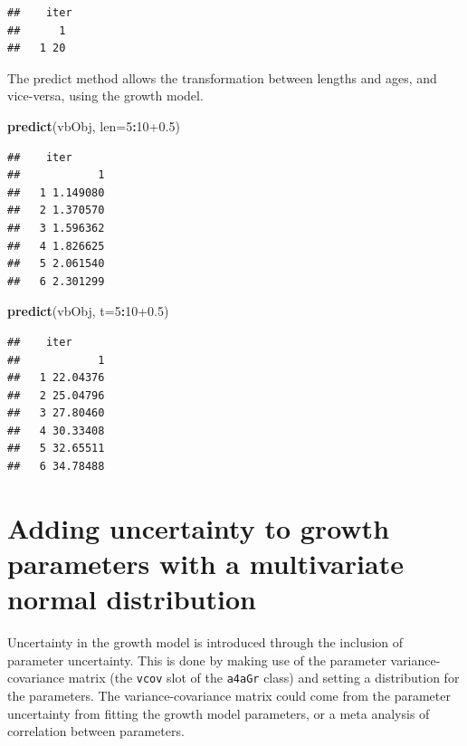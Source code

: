 \documentclass[
]{book}
\newenvironment{Shaded}{\begin{snugshade}}{\end{snugshade}}
\newcommand{\AttributeTok}[1]{\textcolor[rgb]{0.13,0.29,0.53}{#1}}
\newcommand{\DecValTok}[1]{\textcolor[rgb]{0.00,0.00,0.81}{#1}}
\newcommand{\FloatTok}[1]{\textcolor[rgb]{0.00,0.00,0.81}{#1}}
\newcommand{\FunctionTok}[1]{\textcolor[rgb]{0.13,0.29,0.53}{\textbf{#1}}}
\newcommand{\NormalTok}[1]{#1}
\newcommand{\SpecialCharTok}[1]{\textcolor[rgb]{0.81,0.36,0.00}{\textbf{#1}}}
\begin{document}
\begin{verbatim}
##    iter
##      1
##   1 20
\end{verbatim}

The predict method allows the transformation between lengths and ages, and vice-versa, using the growth model.

\begin{Shaded}
\begin{Highlighting}[]
\FunctionTok{predict}\NormalTok{(vbObj, }\AttributeTok{len=}\DecValTok{5}\SpecialCharTok{:}\DecValTok{10}\FloatTok{+0.5}\NormalTok{)}
\end{Highlighting}
\end{Shaded}

\begin{verbatim}
##    iter
##            1
##   1 1.149080
##   2 1.370570
##   3 1.596362
##   4 1.826625
##   5 2.061540
##   6 2.301299
\end{verbatim}

\begin{Shaded}
\begin{Highlighting}[]
\FunctionTok{predict}\NormalTok{(vbObj, }\AttributeTok{t=}\DecValTok{5}\SpecialCharTok{:}\DecValTok{10}\FloatTok{+0.5}\NormalTok{)}
\end{Highlighting}
\end{Shaded}

\begin{verbatim}
##    iter
##            1
##   1 22.04376
##   2 25.04796
##   3 27.80460
##   4 30.33408
##   5 32.65511
##   6 34.78488
\end{verbatim}

\hypertarget{adding-uncertainty-to-growth-parameters-with-a-multivariate-normal-distribution}{%
\section{Adding uncertainty to growth parameters with a multivariate normal distribution}\label{adding-uncertainty-to-growth-parameters-with-a-multivariate-normal-distribution}}

Uncertainty in the growth model is introduced through the inclusion of parameter uncertainty. This is done by making use of the parameter variance-covariance matrix (the \texttt{vcov} slot of the \texttt{a4aGr} class) and setting a distribution for the parameters. The variance-covariance matrix could come from the parameter uncertainty from fitting the growth model parameters, or a meta analysis of correlation between parameters.
\end{document}
